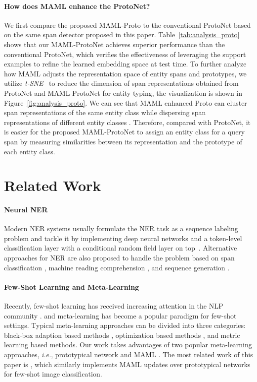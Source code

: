 \documentclass[11pt]{article}
\newcommand\ie{\textit{i.e.}}
\begin{document}
\paragraph{How does MAML enhance the ProtoNet?} 
We first compare the proposed MAML-Proto to the conventional ProtoNet based on the same span detector proposed in this paper.
Table~\ref{tab:analysis_proto} shows that our MAML-ProtoNet achieves superior performance than the conventional ProtoNet, which verifies the effectiveness of leveraging the support examples to refine the learned embedding space at test time.
To further analyze how MAML adjusts the representation space of entity spans and prototypes, we utilize  \textit{t-SNE}~\citep{van2008tsne} to reduce the dimension of span representations obtained from ProtoNet and MAML-ProtoNet for entity typing, the visualization is shown in Figure~\ref{fig:analysis_proto}.
We can see that MAML enhanced Proto can cluster span representations of the same entity class while dispersing span representations of different entity classes .
Therefore, compared with ProtoNet, it is easier for the proposed MAML-ProtoNet to assign an entity class for a query span by measuring similarities between its representation and the prototype of each entity class.


\section{Related Work}
\paragraph{Neural NER}
Modern NER systems usually formulate the NER task as a sequence labeling problem and tackle it by implementing deep neural networks and a token-level classification layer with a conditional random field \citep[CRF]{Lafferty2001conditional} layer on top~\citep{ma2016end, chiu2016named, liu2019towards, devlin2019bert}.
Alternative approaches for NER are also proposed to handle the problem based on span classification \citep{ouchi-2020-instance, fu-etal-2021-spanner}, machine reading comprehension \citep{li2020unified}, and sequence generation \citep{yan-etal-2021-ner-generative}.

\paragraph{Few-Shot Learning and Meta-Learning} 
Recently, few-shot learning
has received increasing attention in the NLP community \citep{han2018fewrel, geng-2019-induction, chen-2019-metalink, brown2020gpt3, schick-schutze-2021-just, gao2021}.
and meta-learning has become a popular paradigm for few-shot settings.
Typical meta-learning approaches can be divided into three categories: black-box adaption based methods \citep{santoro-2016-memoryaug}, optimization based methods \citep{finn2017model}, and metric learning based methods\citep{vinyal-2016-matchnet, snell2017proto}. Our work takes advantages of two popular meta-learning approaches, \ie, prototypical network \citep{snell2017proto} and MAML \citep{finn2017model}.
The most related work of this paper is \citet{trian2020metadata}, which similarly implements MAML updates over prototypical networks for few-shot image classification.
\end{document}
